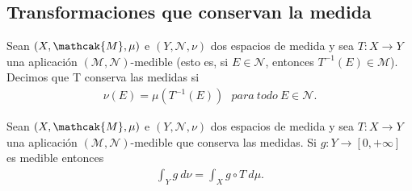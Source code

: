 \subsection{Transformaciones que conservan la medida}
\begin{defi}
Sean $(X, \mathcak{M}, \mu)$ e $(Y, \mathcal{N},\nu)$ dos espacios de medida y sea $T: X \longrightarrow Y$ una aplicación $(\mathcal{M},\mathcal{N})$-medible (esto es, si $E \in \mathcal{N}$, entonces $T^{-1}(E) \in \mathcal{M}$). Decimos que T conserva las medidas si
\begin{align*}
    \nu(E) = \mu(T^{-1}(E)) \ \ \ para \ todo \ E \in \mathcal{N}.
\end{align*}
\end{defi}

\begin{prop}
Sean $(X, \mathcak{M}, \mu)$ e $(Y, \mathcal{N},\nu)$ dos espacios de medida y sea $T: X \longrightarrow Y$ una aplicación $(\mathcal{M},\mathcal{N})$-medible que conserva las medidas. Si $g: Y \longrightarrow [0,+\infty]$ es medible entonces
\begin{align*}
    \int_{Y}{g \ d\nu} = \int_{X}{g \circ T \ d\mu}.
\end{align*}
\end{prop}


